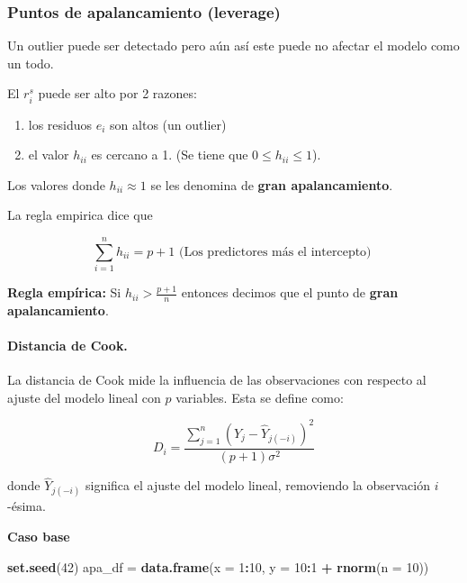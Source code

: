 \documentclass[
  12pt,
]{book}
\newenvironment{Shaded}{\begin{snugshade}}{\end{snugshade}}
\newcommand{\DataTypeTok}[1]{\textcolor[rgb]{0.13,0.29,0.53}{#1}}
\newcommand{\DecValTok}[1]{\textcolor[rgb]{0.00,0.00,0.81}{#1}}
\newcommand{\KeywordTok}[1]{\textcolor[rgb]{0.13,0.29,0.53}{\textbf{#1}}}
\newcommand{\NormalTok}[1]{#1}
\newcommand{\OperatorTok}[1]{\textcolor[rgb]{0.81,0.36,0.00}{\textbf{#1}}}
\newcommand{\StringTok}[1]{\textcolor[rgb]{0.31,0.60,0.02}{#1}}
\providecommand{\tightlist}{%
  \setlength{\itemsep}{0pt}\setlength{\parskip}{0pt}}
\theoremstyle{definition}
\theoremstyle{definition}
\theoremstyle{definition}
\theoremstyle{remark}
\begin{document}
\hypertarget{puntos-de-apalancamiento-leverage}{%
\subsubsection{Puntos de apalancamiento (leverage)}\label{puntos-de-apalancamiento-leverage}}

Un outlier puede ser detectado pero aún así este puede no afectar el modelo como un todo.

El \(r_{i}^s\) puede ser alto por 2 razones:

\begin{enumerate}
\def\labelenumi{\arabic{enumi}.}
\tightlist
\item
  los residuos \(e_i\) son altos (un outlier)
\item
  el valor \(h_{ii}\) es cercano a 1. (Se tiene que \(0\leq h_{ii}\leq 1\)).
\end{enumerate}

Los valores donde \(h_{ii}\approx 1\) se les denomina de \textbf{gran apalancamiento}.

La regla empirica dice que

\begin{equation*}
\sum_{i=1}^{n} h_{ii} = p +1 \text{  (Los predictores más el intercepto)   }
\end{equation*}

\textbf{Regla empírica:} Si \(h_{ii}>\frac{p+1}{n}\) entonces decimos que el punto de \textbf{gran apalancamiento}.

\hypertarget{distancia-de-cook.}{%
\paragraph{Distancia de Cook.}\label{distancia-de-cook.}}

La distancia de Cook mide la influencia de las observaciones con respecto al ajuste del modelo lineal con \(p\) variables. Esta se define como:

\[
\displaystyle D_i = \frac{\sum\limits_{j=1}^n (\hat{Y}_j - \hat{Y}_{j(-i)})^2}{(p+1) \sigma^2}
\]

donde \(\hat{Y}_{j(-i)}\) significa el ajuste del modelo lineal, removiendo la observación \(i\)-ésima.

\textbf{Caso base}

\begin{Shaded}
\begin{Highlighting}[]
\KeywordTok{set.seed}\NormalTok{(}\DecValTok{42}\NormalTok{)}
\NormalTok{apa_df =}\StringTok{ }\KeywordTok{data.frame}\NormalTok{(}\DataTypeTok{x =} \DecValTok{1}\OperatorTok{:}\DecValTok{10}\NormalTok{, }\DataTypeTok{y =} \DecValTok{10}\OperatorTok{:}\DecValTok{1} \OperatorTok{+}\StringTok{ }\KeywordTok{rnorm}\NormalTok{(}\DataTypeTok{n =} \DecValTok{10}\NormalTok{))}
\end{Highlighting}
\end{Shaded}
\end{document}
